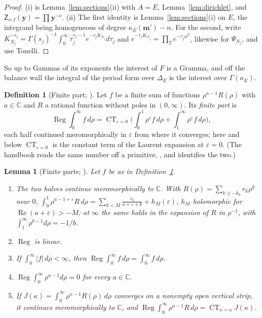 \documentclass[11pt]{article}
\theoremstyle{plain}
\newtheorem{lemma}[prop]{Lemma}
\theoremstyle{definition}
\newtheorem{defn}[prop]{Definition}
\theoremstyle{remark}
\newcommand{\bm}{\mathbf m}
\newcommand{\sZ}{\mathsf Z}
\DeclareMathOperator{\Reg}{Reg}
\DeclareMathOperator{\re}{Re}
\DeclareMathOperator*{\CT}{CT}
\begin{document}
\begin{proof}
(i) is Lemma~\ref{lem:sections}(ii) with $A=E$, Lemma~\ref{lem:dirichlet}, and $\sZ_{\nu;I}(\mathbf y)=\prod\mathbf y^{-\nu}$. (ii) The first identity is Lemma~\ref{lem:sections}(i) on $E$, the integrand being homogeneous of degree $\kappa_E(\bm')-n$. For the second, write $K_{N_j}^{-s_j}=\Gamma(s_j)^{-1}\int_0^\infty\tau_j^{s_j-1}e^{-\tau_jK_{N_j}}d\tau_j$ and $e^{-\tau_jK_{N_j}}=\prod_{T}e^{-\tau_j\alpha^T}$, likewise for $\Psi_{N_j}$, and use Tonelli.
\end{proof}

So up to Gammas of its exponents the interest of $F$ is a Gramma, and off the balance wall the integral of the period form over $\Delta_E$ is the interest over $\Gamma(\kappa_E)$.

\begin{defn}[Finite part; {\cite[Def.~1.4, p.~11; Thm.~1.6, p.~12]{F}}]\label{def:reg}
Let $f$ be a finite sum of functions $\rho^{a-1}R(\rho)$ with $a\in\mathbb C$ and $R$ a rational function without poles in $(0,\infty)$. Its \emph{finite part} is
\[
\Reg\!\int_0^\infty f\,d\rho=\CT_{\varepsilon=0}\Big(\int_0^1\rho^{\varepsilon}f\,d\rho+\int_1^\infty\rho^{\varepsilon}f\,d\rho\Big),
\]
each half continued meromorphically in $\varepsilon$ from where it converges; here and below $\CT_{\varepsilon=0}$ is the constant term of the Laurent expansion at $\varepsilon=0$. (The handbook reads the same number off a primitive, \cite[Def.~1.4, p.~11]{F}, and \cite[Thm.~1.6, p.~12]{F} identifies the two.)
\end{defn}

\begin{lemma}[Finite parts; {\cite[Prop.~1.5, Thm.~1.6, Cor.~1.7, p.~12]{F}}]\label{lem:reg}
Let $f$ be as in Definition~\ref{def:reg}.
\begin{enumerate}[label=(\roman*)]
\item The two halves continue meromorphically to $\mathbb C$. With $R(\rho)=\sum_{k\ge-k_0}r_k\rho^k$ near $0$, $\int_0^1\rho^{a-1+\varepsilon}R\,d\rho=\sum_{k<M}\frac{r_k}{a+\varepsilon+k}+h_M(\varepsilon)$, $h_M$ holomorphic for $\re(a+\varepsilon)>-M$; at $\infty$ the same holds in the expansion of $R$ in $\rho^{-1}$, with $\int_1^\infty\rho^{b-1}d\rho=-1/b$.
\item $\Reg$ is linear.
\item If $\int_0^\infty|f|\,d\rho<\infty$, then $\Reg\!\int_0^\infty f\,d\rho=\int_0^\infty f\,d\rho$.
\item $\Reg\!\int_0^\infty\rho^{a-1}d\rho=0$ for every $a\in\mathbb C$.
\item If $J(\kappa)=\int_0^\infty\rho^{\kappa-1}R(\rho)\,d\rho$ converges on a nonempty open vertical strip, it continues meromorphically to $\mathbb C$, and $\Reg\!\int_0^\infty\rho^{a-1}R\,d\rho=\CT_{\kappa=a}J(\kappa)$.
\end{enumerate}
\end{lemma}
\end{document}
